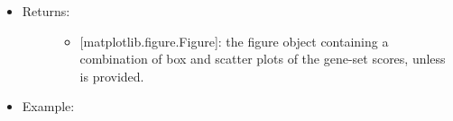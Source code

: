 \documentclass[letterpaper,10pt,english]{sphinxmanual}
\begin{document}
\begin{fulllineitems}
\begin{itemize}
\begin{description}
\begin{itemize}
\end{itemize}

\end{description}

\item {} \begin{description}
\item[{Returns:}] \leavevmode\begin{itemize}
\item {} 
{[}matplotlib.figure.Figure{]}: the figure object containing a
combination of box and scatter plots of the gene-set scores,
unless  is provided.

\end{itemize}

\end{description}

\item {} \begin{description}
\item[{Example:}] \leavevmode
\begin{sphinxVerbatim}[commandchars=\\\{\}]
 \PYG{p}{[} \PYG{p}{]}
\end{sphinxVerbatim}


\end{description}

\end{itemize}

\end{fulllineitems}

\end{document}
